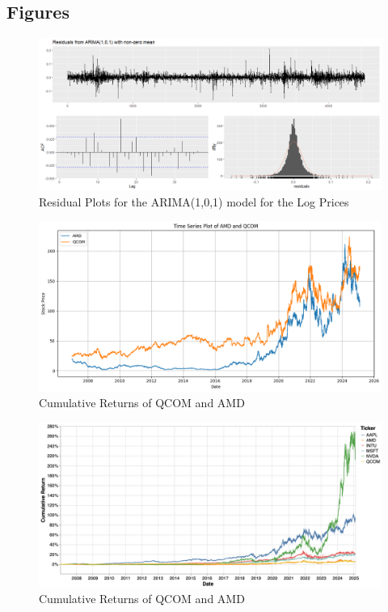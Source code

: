 \begin{appendices}
	\chapter{Figures}
	\begin{figure}[h]
		\centering
		\includegraphics[width=0.7\linewidth]{content/plots/residual_plot_1_1.png}
		\caption{Residual Plots for the ARIMA(1,0,1) model for the Log Prices}
		\label{fig:residual_plot_1_1}
	\end{figure}
	
	\begin{figure}[!h]
		\centering
		\includegraphics[width=0.8\linewidth]{content/plots/QCOM_AMD.png}
		\caption{Cumulative Returns of QCOM and AMD}
		\label{fig:amd_qcom_cumul_returns}
	\end{figure}
	
		\begin{figure}[!h]
		\centering
		\includegraphics[width=0.8\linewidth]{content/plots/visualization.png}
		\caption{Cumulative Returns of QCOM and AMD}
		\label{fig:sample_securities}
	\end{figure}
	

\end{appendices}
